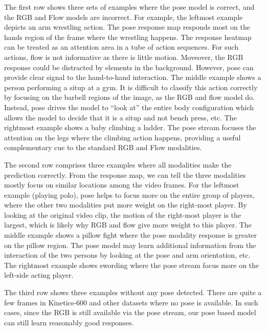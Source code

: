 \documentclass[10pt,twocolumn,letterpaper]{article}
\begin{document}
The first row shows three sets of examples where the pose model is correct, and the RGB and Flow models are incorrect. For example, the leftmost example depicts an arm wrestling action. The pose response map responds most on the hands region of the frame where the wrestling happens. The response heatmap can be treated as an attention area in a tube of action sequences. For such actions, flow is not informative as there is little motion. Moveover, the RGB response could be distracted by elements in the background. However, pose can provide clear signal to the hand-to-hand interaction. The middle example shows a person performing a situp at a gym. It is difficult to classify this action correctly by focusing on the barbell regions of the image, as the RGB and flow model do. Instead, pose drives the model to ``look at'' the entire body configuration which allows the model to decide that it is a situp and not bench press, etc. The rightmost example shows a baby climbing a ladder. The pose stream focuses the attention on the legs where the climbing action happens, providing a useful complementary cue to the standard RGB and Flow modalities.

The second row comprises three examples where all modalities make the prediction correctly. From the response map, we can tell the three modalities mostly focus on similar locations among the video frames. For the leftmost example (playing polo), pose helps to focus more on the entire group of players, where the other two modalities put more weight on the right-most player. By looking at the original video clip, the motion of the right-most player is the largest, which is likely why RGB and flow give more weight to this player. The middle example shows a pillow fight where the pose modality response is greater on the pillow region. The pose model may learn additional information from the interaction of the two persons by looking at the pose and arm orientation, etc. The rightmost example shows swording where the pose stream focus more on the left-side acting player.

The third row shows three examples without any pose detected. There are quite a few frames in Kinetics-600 and other datasets where no pose is available. In such cases, since the RGB is still available via the pose stream, our pose based model can still learn reasonably good responses.
\end{document}
